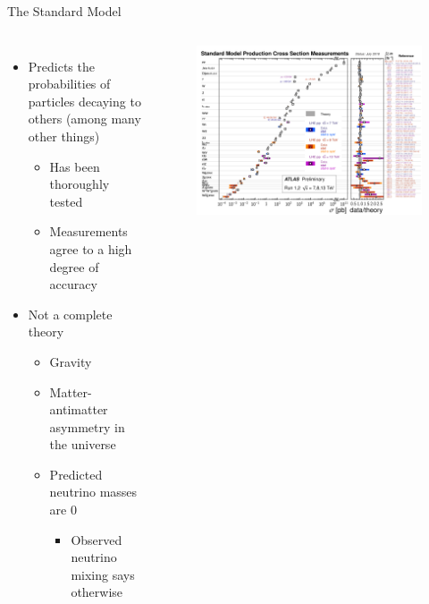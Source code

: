 \documentclass[aspectratio=169,xcolor=table]{beamer}
\begin{document}
  \begin{frame}[c]{The Standard Model}
    \begin{columns}
      \small
      \begin{itemize}
        \item Predicts the probabilities of particles decaying to others (among many other things)
        \begin{itemize}
          \item Has been thoroughly tested
          \item Measurements agree to a high degree of accuracy
        \end{itemize}
        \item Not a complete theory
        \begin{itemize}
          \item Gravity
          \item Matter-antimatter asymmetry in the universe
          \item Predicted neutrino masses are 0
          \begin{itemize}
            \item Observed neutrino mixing says otherwise
          \end{itemize}
        \end{itemize}
      \end{itemize}
      \begin{figure}
        \centering
        \includegraphics[width=\textwidth,keepaspectratio=true]{ATLAS_d_SMSummary_FiducialXsect_rotated.png}
      \end{figure}
    \end{columns}
  \end{frame}
\end{document}
